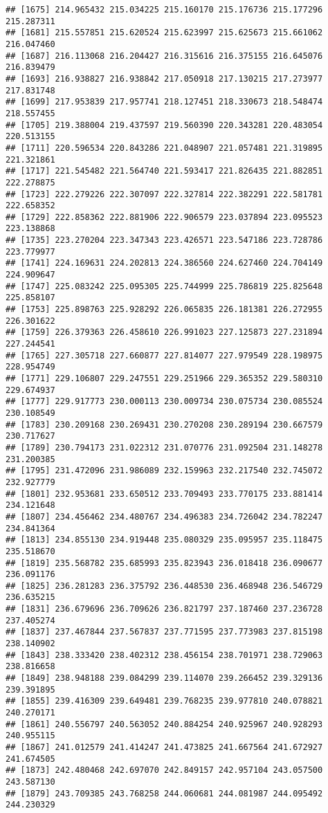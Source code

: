 \documentclass[]{article}
\begin{document}
\begin{verbatim}
## [1675] 214.965432 215.034225 215.160170 215.176736 215.177296 215.287311
## [1681] 215.557851 215.620524 215.623997 215.625673 215.661062 216.047460
## [1687] 216.113068 216.204427 216.315616 216.375155 216.645076 216.839479
## [1693] 216.938827 216.938842 217.050918 217.130215 217.273977 217.831748
## [1699] 217.953839 217.957741 218.127451 218.330673 218.548474 218.557455
## [1705] 219.388004 219.437597 219.560390 220.343281 220.483054 220.513155
## [1711] 220.596534 220.843286 221.048907 221.057481 221.319895 221.321861
## [1717] 221.545482 221.564740 221.593417 221.826435 221.882851 222.278875
## [1723] 222.279226 222.307097 222.327814 222.382291 222.581781 222.658352
## [1729] 222.858362 222.881906 222.906579 223.037894 223.095523 223.138868
## [1735] 223.270204 223.347343 223.426571 223.547186 223.728786 223.779977
## [1741] 224.169631 224.202813 224.386560 224.627460 224.704149 224.909647
## [1747] 225.083242 225.095305 225.744999 225.786819 225.825648 225.858107
## [1753] 225.898763 225.928292 226.065835 226.181381 226.272955 226.301622
## [1759] 226.379363 226.458610 226.991023 227.125873 227.231894 227.244541
## [1765] 227.305718 227.660877 227.814077 227.979549 228.198975 228.954749
## [1771] 229.106807 229.247551 229.251966 229.365352 229.580310 229.674937
## [1777] 229.917773 230.000113 230.009734 230.075734 230.085524 230.108549
## [1783] 230.209168 230.269431 230.270208 230.289194 230.667579 230.717627
## [1789] 230.794173 231.022312 231.070776 231.092504 231.148278 231.200385
## [1795] 231.472096 231.986089 232.159963 232.217540 232.745072 232.927779
## [1801] 232.953681 233.650512 233.709493 233.770175 233.881414 234.121648
## [1807] 234.456462 234.480767 234.496383 234.726042 234.782247 234.841364
## [1813] 234.855130 234.919448 235.080329 235.095957 235.118475 235.518670
## [1819] 235.568782 235.685993 235.823943 236.018418 236.090677 236.091176
## [1825] 236.281283 236.375792 236.448530 236.468948 236.546729 236.635215
## [1831] 236.679696 236.709626 236.821797 237.187460 237.236728 237.405274
## [1837] 237.467844 237.567837 237.771595 237.773983 237.815198 238.140902
## [1843] 238.333420 238.402312 238.456154 238.701971 238.729063 238.816658
## [1849] 238.948188 239.084299 239.114070 239.266452 239.329136 239.391895
## [1855] 239.416309 239.649481 239.768235 239.977810 240.078821 240.270171
## [1861] 240.556797 240.563052 240.884254 240.925967 240.928293 240.955115
## [1867] 241.012579 241.414247 241.473825 241.667564 241.672927 241.674505
## [1873] 242.480468 242.697070 242.849157 242.957104 243.057500 243.587130
## [1879] 243.709385 243.768258 244.060681 244.081987 244.095492 244.230329

\end{verbatim}
\end{document}
